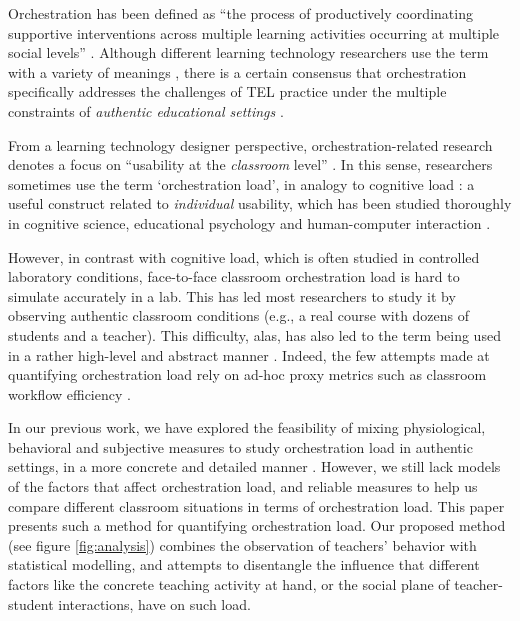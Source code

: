 \documentclass[10pt,journal,compsoc]{IEEEtran}
\begin{document}
Orchestration has been defined as ``the process of productively coordinating supportive interventions across multiple learning activities occurring at multiple social levels'' \cite{Dillenbourg2009}. Although different learning technology researchers use the term with a variety of meanings \cite{Prieto2011}, there is a certain consensus that orchestration specifically addresses the challenges of TEL practice under the multiple constraints of \textit{authentic educational settings} \cite{Roschelle2013}.

From a learning technology designer perspective, orchestration-related research denotes a focus on ``usability at the \textit{classroom} level'' \cite{Dillenbourg2011}. In this sense, researchers sometimes use the term `orchestration load', in analogy to cognitive load \cite{Dillenbourg2013,Cuendet2013}: a useful construct related to \textit{individual} usability, which has been studied thoroughly in cognitive science, educational psychology and human-computer interaction \cite{sweller1994cognitive,oviatt2006human}.

However, in contrast with cognitive load, which is often studied in controlled laboratory conditions, face-to-face classroom orchestration load is hard to simulate accurately in a lab. This has led most researchers to study it by observing authentic classroom conditions (e.g., a real course with dozens of students and a teacher). This difficulty, alas, has also led to the term being used in a rather high-level and abstract manner \cite{Dillenbourg2013,Cuendet2013}. Indeed, the few attempts made at quantifying orchestration load rely on ad-hoc proxy metrics such as classroom workflow efficiency \cite{Alavi2012}.

In our previous work, we have explored the feasibility of mixing physiological, behavioral and subjective measures to study orchestration load in authentic settings, in a more concrete and detailed manner \cite{Prieto2015ectel}. However, we still lack models of the factors that affect orchestration load, and reliable measures to help us compare different classroom situations in terms of orchestration load. This paper presents such a method for quantifying orchestration load. Our proposed method (see figure \ref{fig:analysis}) combines the observation of teachers' behavior with statistical modelling, and attempts to disentangle the influence that different factors like the concrete teaching activity at hand, or the social plane of teacher-student interactions, have on such load.
\end{document}
